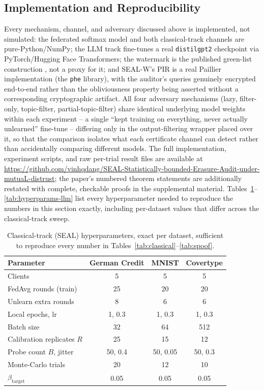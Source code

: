 \documentclass[10pt,journal,compsoc]{IEEEtran}
\begin{document}
\subsection{Implementation and Reproducibility}

Every mechanism, channel, and adversary discussed above is implemented, not simulated: the federated softmax model and both classical-track channels are pure-Python/NumPy; the LLM track fine-tunes a real \texttt{distilgpt2} checkpoint via PyTorch/Hugging Face Transformers; the watermark is the published green-list construction \cite{kirchenbauer2023watermark}, not a proxy for it; and SEAL-W's PIR is a real Paillier implementation (the \texttt{phe} library), with the auditor's queries genuinely encrypted end-to-end rather than the obliviousness property being asserted without a corresponding cryptographic artifact. All four adversary mechanisms (lazy, filter-only, topic-filter, partial-topic-filter) share identical underlying model weights within each experiment -- a single ``kept training on everything, never actually unlearned'' fine-tune -- differing only in the output-filtering wrapper placed over it, so that the comparison isolates what each certificate channel can detect rather than accidentally comparing different models. The full implementation, experiment scripts, and raw per-trial result files are available at \url{https://github.com/vinhqdang/SEAL-Statistically-bounded-Erasure-Audit-under-mutuaL-distrust}; the paper's numbered theorem statements are additionally restated with complete, checkable proofs in the supplemental material. Tables~\ref{tab:hyperparams-classical}--\ref{tab:hyperparams-llm} list every hyperparameter needed to reproduce the numbers in this section exactly, including per-dataset values that differ across the classical-track sweep.

\begin{table}[t]
\centering
\footnotesize
\caption{Classical-track (SEAL) hyperparameters, exact per dataset, sufficient to reproduce every number in Tables~\ref{tab:classical}--\ref{tab:spoof}.}
\label{tab:hyperparams-classical}
\begin{tabular}{@{}lccc@{}}
\toprule
Parameter & German Credit & MNIST & Covertype \\
\midrule
Clients & 5 & 5 & 5 \\
FedAvg rounds (train) & 25 & 20 & 20 \\
Unlearn extra rounds & 8 & 6 & 6 \\
Local epochs, lr & 1, 0.3 & 1, 0.3 & 1, 0.3 \\
Batch size & 32 & 64 & 512 \\
Calibration replicates $R$ & 25 & 15 & 12 \\
Probe count $B$, jitter & 50, 0.4 & 50, 0.05 & 50, 0.3 \\
Monte-Carlo trials & 20 & 12 & 10 \\
$\beta_{\text{target}}$ & 0.05 & 0.05 & 0.05 \\
\bottomrule
\end{tabular}
\end{table}
\end{document}
